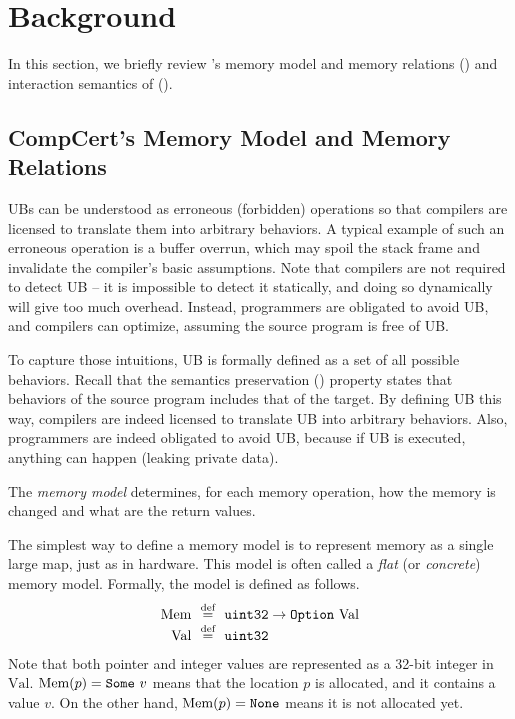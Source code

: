\section{Background}
\label{sec:compiler:background}

In this section, we briefly review \cc{}'s memory model and memory relations () and interaction semantics of \ccc{} ().

\subsection{CompCert's Memory Model and Memory Relations}
\label{sec:compiler:background:compcert}

UBs can be understood as erroneous (forbidden) operations so that compilers are licensed to translate them into arbitrary behaviors.
A typical example of such an erroneous operation is a buffer overrun, which may spoil the stack frame and invalidate the compiler's basic assumptions.
Note that compilers are not required to detect UB -- it is impossible to detect it statically, and doing so dynamically will give too much overhead.
Instead, programmers are obligated to avoid UB, and compilers can optimize, assuming the source program is free of UB.

To capture those intuitions, UB is formally defined as a set of all possible behaviors.
Recall that the semantics preservation () property states that behaviors of the source program includes that of the target.
By defining UB this way, compilers are indeed licensed to translate UB into arbitrary behaviors.
Also, programmers are indeed obligated to avoid UB, because if UB is executed, anything can happen (\eg{}leaking private data).


The {\it memory model} determines, for each memory operation, how the memory is changed and what are the return values.

The simplest way to define a memory model is to represent memory as a single large map, just as in hardware.
This model is often called a {\it flat} (or {\it concrete}) memory model.
Formally, the model is defined as follows.
\[
\begin{array}{r@{~~}c@{~~}l}
\textrm{Mem} & \defeq & \texttt{uint32} \rightarrow \option{\textrm{Val}} \\ %
\textrm{Val} & \defeq & \texttt{uint32}
\end{array}
\]
Note that both pointer and integer values are represented as a 32-bit integer in $\textrm{Val}$.
$\textrm{Mem}(p) = \mathtt{Some}\ {v}$ means that the location $p$ is allocated, and it contains a value $v$. On the other hand, $\textrm{Mem}(p) = \texttt{None}$ means it is not allocated yet.


